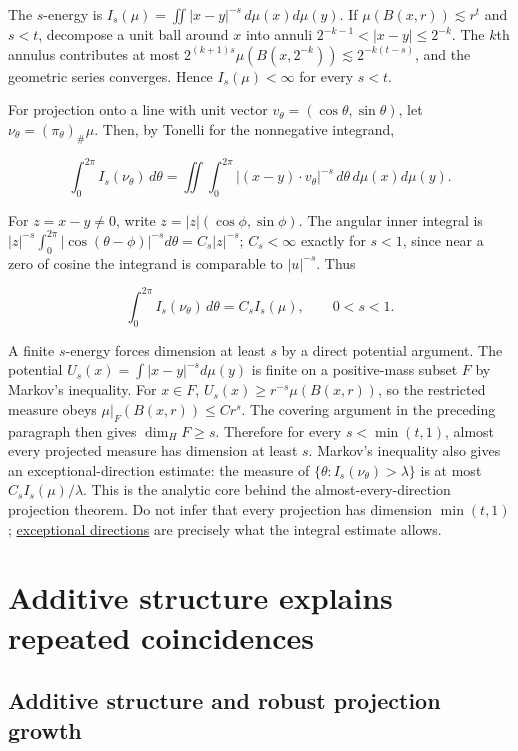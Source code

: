 The \(s\)-energy is \(I_s(\mu)=\iint|x-y|^{-s}\,d\mu(x)d\mu(y)\). If \(\mu(B(x,r))\lesssim r^t\) and \(s<t\), decompose a unit ball around \(x\) into annuli \(2^{-k-1}<|x-y|\le2^{-k}\). The \(k\)th annulus contributes at most \(2^{(k+1)s}\mu(B(x,2^{-k}))\lesssim2^{-k(t-s)}\), and the geometric series converges. Hence \(I_s(\mu)<\infty\) for every \(s<t\).

For projection onto a line with unit vector \(v_\theta=(\cos\theta,\sin\theta)\), let \(\nu_\theta=(\pi_\theta)_\#\mu\). Then, by Tonelli for the nonnegative integrand,

\[\int_0^{2\pi}I_s(\nu_\theta)\,d\theta
=\iint\int_0^{2\pi}|(x-y)\cdot v_\theta|^{-s}\,d\theta\,d\mu(x)d\mu(y).\]

For \(z=x-y\ne0\), write \(z=|z|(\cos\phi,\sin\phi)\). The angular inner integral is \(|z|^{-s}\int_0^{2\pi}|\cos(\theta-\phi)|^{-s}d\theta=C_s|z|^{-s}\); \(C_s<\infty\) exactly for \(s<1\), since near a zero of cosine the integrand is comparable to \(|u|^{-s}\). Thus

\[\int_0^{2\pi}I_s(\nu_\theta)\,d\theta=C_s I_s(\mu),\qquad 0<s<1.\]

A finite \(s\)-energy forces dimension at least \(s\) by a direct potential argument. The potential \(U_s(x)=\int|x-y|^{-s}d\mu(y)\) is finite on a positive-mass subset \(F\) by Markov's inequality. For \(x\in F\), \(U_s(x)\ge r^{-s}\mu(B(x,r))\), so the restricted measure obeys \(\mu|_F(B(x,r))\le Cr^s\). The covering argument in the preceding paragraph then gives \(\dim_H F\ge s\). Therefore for every \(s<\min(t,1)\), almost every projected measure has dimension at least \(s\). Markov's inequality also gives an exceptional-direction estimate: the measure of \(\{\theta:I_s(\nu_\theta)>\lambda\}\) is at most \(C_s I_s(\mu)/\lambda\). This is the analytic core behind the almost-every-direction projection theorem. Do not infer that every projection has dimension \(\min(t,1)\); \hyperref[appendix-3c73f7862157]{exceptional directions} are precisely what the integral estimate allows.

\section{Additive structure explains repeated coincidences}\label{04-visual-computing-ii-ch033-additive-structure-explains-repeated-coincidences}

\subsection{Additive structure and robust projection growth}\label{04-visual-computing-ii-ch033-additive-structure-and-robust-projection-growth}

